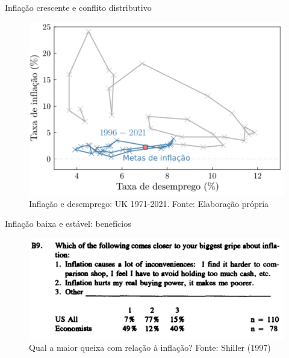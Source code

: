 \documentclass[10pt]{beamer}
\begin{document}
\begin{frame}
    {Inflação crescente e conflito distributivo}
    \begin{figure}
        \includegraphics[width=.65\textwidth]{./figures/aula15_fig15.PNG}
        \caption{Inflação e desemprego: UK 1971-2021. Fonte: Elaboração própria}
    \end{figure}
\end{frame}

\begin{frame}
    {Inflação baixa e estável: benefícios}
    \begin{figure}
        \includegraphics[width=\textwidth]{./figures/aula15_fig16.PNG}
        \caption{Qual a maior queixa com relação à inflação? Fonte: Shiller (1997)}
    \end{figure}
\end{frame}
\end{document}
